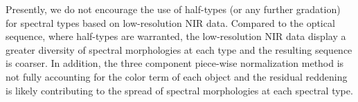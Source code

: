 \documentclass[modern,trackchanges]{aastex61}
\begin{document}
Presently, we do not encourage the use of half-types (or any further gradation) for spectral types based on low-resolution NIR data.
Compared to the optical sequence, where half-types are warranted, the low-resolution NIR data display a greater diversity of spectral morphologies at each type and the resulting sequence is coarser.
In addition, the three component piece-wise normalization method is not fully accounting for the color term of each object and the residual reddening is likely contributing to the spread of spectral morphologies at each spectral type.

\end{document}
